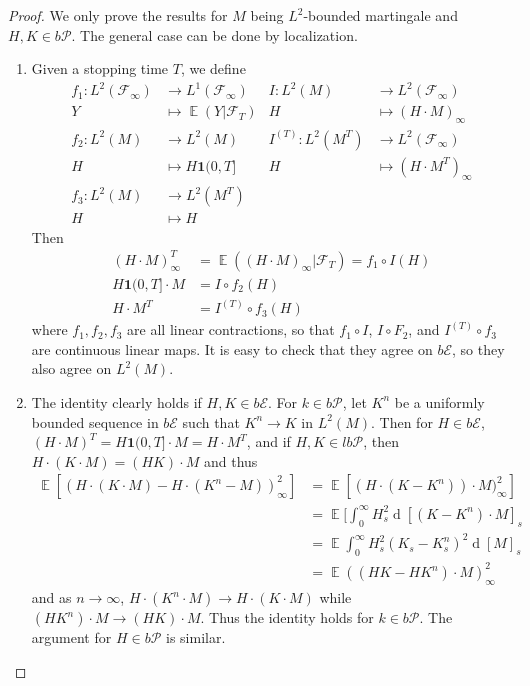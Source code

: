 \documentclass[11pt, a4paper]{memoir}
\theoremstyle{change}
\theoremstyle{plain}
\theoremstyle{nonumberplain}
\newtheorem{proof}{Proof}
\DeclareMathOperator{\E}{{\mathbb{E}}}
\renewcommand{\d}[1]{\ensuremath{\operatorname{d}\!{#1}}}
\newcommand{\idc}{\mathbf{1}}
\numberwithin{equation}{section}
\begin{document}
\begin{proof}
    We only prove the results for $M$ being $L^2$-bounded martingale and $H,K\in b\mathcal{P}$.
    The general case can be done by localization.
    \begin{enumerate}
        \item Given a stopping time $T$, we define
            \begin{align*}
                f_1: L^2(\mathcal{F}_\infty) &\to L^1(\mathcal{F}_\infty) & I:L^2(M) &\to L^2(\mathcal{F}_\infty)\\
                Y &\mapsto \E(Y|\mathcal{F}_T) & H &\mapsto (H\cdot M)_\infty\\
                f_2: L^2(M) &\to L^2(M) & I^{(T)}:L^2(M^T) &\to L^2(\mathcal{F}_\infty)\\
                H &\mapsto H\idc{(0,T]} & H &\mapsto (H\cdot M^T)_\infty\\
                f_3 : L^2(M) &\to L^2(M^T)\\
                H &\mapsto H
            \end{align*}
            Then
            \begin{align*}
                (H\cdot M)_\infty^T &= \E((H\cdot M)_\infty|\mathcal{F}_T) = f_1\circ I(H)\\
                H\idc{(0,T]}\cdot M&=I\circ f_2(H)\\
                H\cdot M^T &= I^{(T)}\circ f_3(H)
            \end{align*}
            where $f_1,f_2,f_3$ are all linear contractions, so that $f_1\circ I$, $I\circ F_2$, and $I^{(T)}\circ f_3$ are continuous linear maps.
            It is easy to check that they agree on $b\mathcal{E}$, so they also agree on $L^2(M)$.
        \item The identity clearly holds if $H,K\in b\mathcal{E}$.
            For $k\in b\mathcal{P}$, let $K^n$ be a uniformly bounded sequence in $b\mathcal{E}$ such that $K^n\to K$ in $L^2(M)$.
            Then for $H\in b\mathcal{E}$, $(H\cdot M)^T=H\idc{(0,T]}\cdot M=H\cdot M^T$, and if $H,K\in lb\mathcal{P}$, then $H\cdot(K\cdot M)=(HK)\cdot M$ and thus
            \begin{align*}
                \E[(H\cdot(K\cdot M)-H\cdot(K^n-M))^2_\infty] &= \E[(H\cdot(K-K^n))\cdot M)^2_\infty]\\
                                                              &= \E[\int_0^\infty H_s^2\d{[(K-K^n)\cdot M]_s}\\
                                                              &= \E\int_0^\infty H_s^2(K_s-K_s^n)^2\d{[M]_s}\\
                                                              &= \E((HK-HK^n)\cdot M)_\infty^2
            \end{align*}
            and as $n\to\infty$, $H\cdot(K^n\cdot M)\to H\cdot(K\cdot M)$ while $(HK^n)\cdot M\to (HK)\cdot M$.
            Thus the identity holds for $k\in b\mathcal{P}$.
            The argument for $H\in b\mathcal{P}$ is similar.
    \end{enumerate}
\end{proof}
\end{document}

